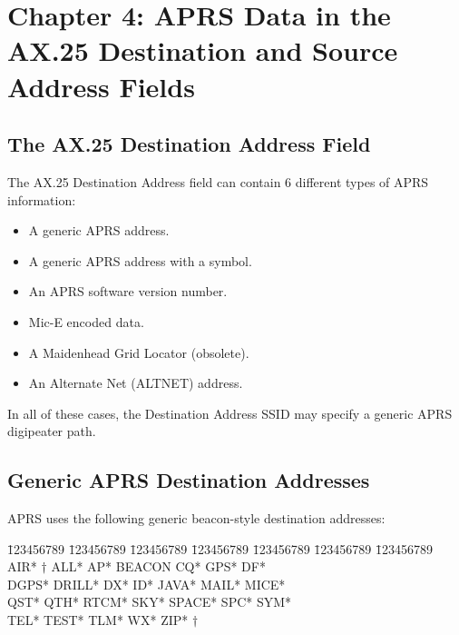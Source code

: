 \chapter{Chapter 4: APRS Data in the AX.25 Destination and Source Address Fields}


\section{The AX.25 Destination Address Field}

The AX.25 Destination Address field can contain 6 different types of APRS
information:

\begin{itemize}

\item A generic APRS address.

\item A generic APRS address with a symbol.

\item An APRS software version number.

\item Mic-E encoded data.

\item A Maidenhead Grid Locator (obsolete).

\item An Alternate Net (ALTNET) address.

\end{itemize}

In all of these cases, the Destination Address SSID may specify a generic
APRS digipeater path.

\section {Generic APRS Destination Addresses}

APRS uses the following generic beacon-style destination addresses:


\begin{tabbing}
\= 123456789 \=123456789 \=123456789 \=123456789 \=123456789 \=123456789 \=123456789 \kill
\> AIR* $\dagger$  \> ALL*   \> AP*   \> BEACON \> CQ*  \> GPS*   \> DF*   \\
\> DGPS*  \> DRILL* \> DX*   \> ID*    \> JAVA* \> MAIL* \> MICE* \\
\> QST*   \> QTH*   \> RTCM* \>SKY*    \> SPACE* \> SPC*  \> SYM* \\
\> TEL*   \> TEST*  \> TLM*  \> WX*    \> ZIP* $\dagger$ \\

\end{tabbing}

